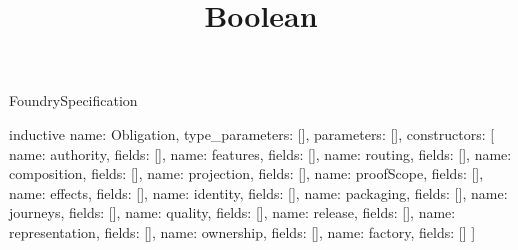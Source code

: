 \begin{lexlean}{FoundrySpecification}
\title{Boolean}
\begin{semanticmodule}
inductive{
  name: Obligation,
  type_parameters: [],
  parameters: [],
  constructors: [
    {name: authority, fields: []},
    {name: features, fields: []},
    {name: routing, fields: []},
    {name: composition, fields: []},
    {name: projection, fields: []},
    {name: proofScope, fields: []},
    {name: effects, fields: []},
    {name: identity, fields: []},
    {name: packaging, fields: []},
    {name: journeys, fields: []},
    {name: quality, fields: []},
    {name: release, fields: []},
    {name: representation, fields: []},
    {name: ownership, fields: []},
    {name: factory, fields: []}
  ]
}


\end{semanticmodule}
\end{lexlean}
